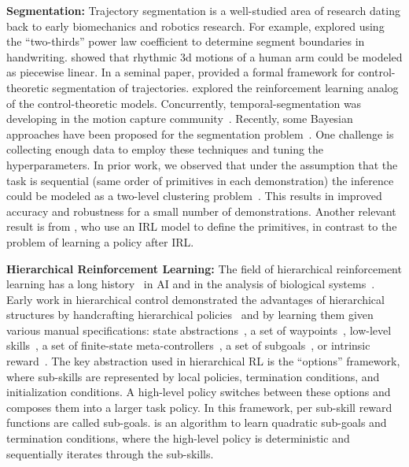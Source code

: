 \vspace{0.25em}\noindent\textbf{Segmentation: } Trajectory segmentation is a well-studied area of research dating back to early biomechanics and robotics research.
For example, \cite{viviani1985segmentation} explored using the ``two-thirds'' power law coefficient to determine segment boundaries in handwriting.
\cite{morasso1983three} showed that rhythmic 3d motions of a human arm could be modeled as piecewise linear.
In a seminal paper, \cite{sternad1999segmentation} provided a formal framework for control-theoretic segmentation of trajectories.
\cite{botvinick2009hierarchically} explored the reinforcement learning analog of the control-theoretic models.
Concurrently, temporal-segmentation was developing in the motion capture community~\citep{moeslund2001survey}.
Recently, some Bayesian approaches have been proposed for the segmentation problem~\citep{asfour2006imitation,calinon2004stochastic,kruger2010learning, vakanski2012trajectory,tanwani2016learning}.
One challenge is collecting enough data to employ these techniques and tuning the hyperparameters.
In prior work, we observed that under the assumption that the task is sequential (same order of primitives in each demonstration) the inference could be modeled as a two-level clustering problem~\citep{krishnan2015tsc}.
This results in improved accuracy and robustness for a small number of demonstrations.
Another relevant result is from \cite{ranchod2015nonparametric}, who use an IRL model to define the primitives, in contrast to the problem of learning a policy after IRL.

\vspace{0.25em}\noindent\textbf{Hierarchical Reinforcement Learning: } 
The field of hierarchical reinforcement learning has a long history~\citep{parr98,suttonPS99,barto03} in AI and in the analysis of biological systems~\citep{botvinick08,botvinick2009hierarchically,solway2014optimal,zacksKEH11,whitenFBL06}.
Early work in hierarchical control demonstrated the advantages of hierarchical structures by handcrafting hierarchical policies~\citep{brooks1986robust} and by learning them given various manual specifications: state abstractions~\citep{dayanH92,hengst02,kolterAN07,konidarisB07}, a set of waypoints~\citep{kaelbling93}, low-level skills~\citep{huberG97,baconP15,liaw17composing}, a set of finite-state meta-controllers~\citep{parrR97}, a set of subgoals~\citep{suttonPS99,dietterich00}, or intrinsic reward~\citep{kulkarni2016hierarchical}.
The key abstraction used in hierarchical RL is the ``options'' framework, where sub-skills are represented by local policies, termination conditions, and initialization conditions.
A high-level policy switches between these options and composes them into a larger task policy.
In this framework, per sub-skill reward functions are called sub-goals. \hirl is an algorithm to learn quadratic sub-goals and termination conditions, where the high-level policy is deterministic and sequentially iterates through the sub-skills. 

